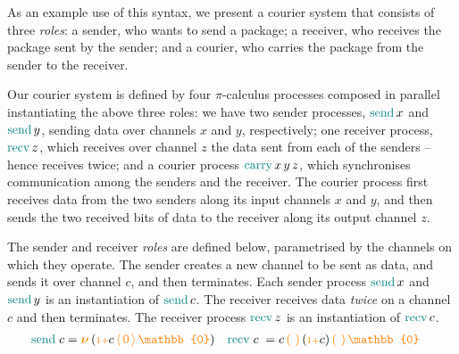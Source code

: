 \documentclass[runningheads]{llncs}
\newcommand{\picalc}{$\pi$-calculus}
\newcommand{\constr}[1]{\textcolor{orange}{\operatorname{#1}}}
\newcommand{\func}[1]{\textcolor{teal}{\operatorname{#1}}}
\newcommand{\PO}{\constr{\mathbb{0}}}
\newcommand{\new}{\constr{\boldsymbol{\nu}} \,}
\newcommand{\send}[2]{#1 \, \constr{\langle} \, #2 \,\constr{\rangle} \,}
\newcommand{\recv}[2]{#1 \, \constr{\mathbb{(}} \, #2 \, \constr{\mathbb{)}} \,}
\newcommand{\suc}{\constr{\scriptstyle 1+}}
\begin{document}
\begin{example}
\label{example-process}

As an example use of this syntax, we present a courier system that consists of three \emph{roles}:
a sender, who wants to send a package;
a receiver, who receives the package sent by the sender;
and a courier, who carries the package from the sender to the receiver.
\begin{center}
  \small
\end{center}

Our courier system is defined by four \picalc{} processes composed in parallel instantiating the above three roles:
we have two sender processes, $\func{send} \, x$ and $\func{send} \, y$, sending data over channels $x$ and $y$, respectively;
one receiver process, $\func{recv} \, z$, which receives over channel $z$ the data sent from each of the senders -- hence receives twice;
and a courier process $\func{carry} \, x \, y \, z$, which synchronises communication among the senders and the receiver.
The courier process first receives data from the two senders along its input channels $x$ and $y$, and then sends the two received bits of data to the receiver along its output channel $z$.

The sender and receiver \emph{roles} are defined below, parametrised by the channels on which they operate.
The sender creates a new channel to be sent as data, and sends it over channel $c$, and then terminates.
Each sender process $\func{send} \, x$ and $\func{send} \, y$ is an instantiation of $\func{send} \, c$.
The receiver receives data \emph{twice} on a channel $c$ and then terminates.
The receiver process $\func{recv} \, z$ is an instantiation of $\func{recv} \, c$.
\begin{align*}
  & \func{send} \; c = \new{} (\send{\suc c}{\constr{0}} \PO) &&
    \func{recv} \; c \; = \recv{c}{} \recv{(\suc c)}{} \PO
\end{align*}


\end{example}
\end{document}
